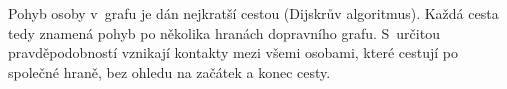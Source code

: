 
Pohyb osoby v~grafu je dán nejkratší cestou (Dijskrův algoritmus). Každá cesta tedy znamená pohyb po několika hranách dopravního grafu. S~určitou prav\-dě\-po\-dob\-nos\-tí vznikají kontakty mezi všemi osobami, které cestují po společné hraně, bez ohledu na začátek a konec cesty. 








